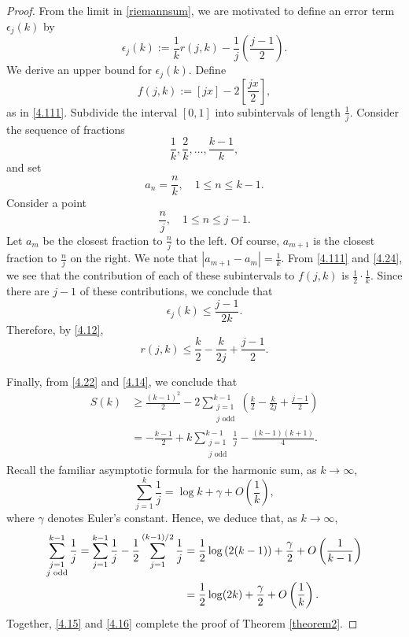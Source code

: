 \documentclass[11pt,reqno]{amsart}
\newcommand{\df}{\dfrac}
\theoremstyle{plain}
\numberwithin{equation}{section}
\begin{document}
\begin{proof}
From the limit in \eqref{riemannsum}, we are motivated to define an error term $\epsilon_j(k)$ by
\begin{equation}\label{4.12}
\epsilon_j(k):= \frac{1}{k} r(j,k) -\frac{1}{j}\left(\frac{j-1}{2}\right).
\end{equation}
 We derive an upper bound for $\epsilon_j(k).$  Define
 \begin{equation}\label{4.24}
  f(j,k):=[ jx]-2\left[\frac{jx}{2}\right],
  \end{equation}
  as in \eqref{4.111}.  Subdivide the interval $[0,1]$ into subintervals of length $\frac{1}{j}.$ Consider the sequence of fractions
 $$\frac{1}{k},\frac{2}{k},\dots,\frac{k-1}{k},$$
 and set
 $$a_n=\frac{n}{k},\quad 1\leq n \leq k-1.$$
 Consider a point
 $$\frac{n}{j}, \quad 1\leq n \leq j-1.$$
   Let $a_m$ be the closest fraction to $\frac{n}{j}$ to the left. Of course, $a_{m+1}$ is the closest fraction to $\frac{n}{j}$ on the right.  We note that $|a_{m+1}-a_m|=\frac{1}{k}$.  From \eqref{4.111} and \eqref{4.24}, we see that the contribution of each of these subintervals to $f(j,k)$ is $\frac12\cdot\frac{1}{k}$. Since there are $j-1$ of these contributions, we conclude that
 $$ \epsilon_j(k)\leq \dfrac{j-1}{2k}.$$
 Therefore, by \eqref{4.12},
 \begin{equation}\label{4.14}
 r(j,k)\leq \frac{k}{2}-\frac{k}{2j}+\frac{j-1}{2} .
\end{equation}

Finally, from \eqref{4.22} and \eqref{4.14}, we conclude that
\begin{align}\label{4.15}
	S(k)
	&\geq \frac{(k-1)^2}{2}-2\sum_{\substack{j=1\\j\text{ odd}}}^{k-1}\left(\frac{k}{2}-\frac{k}{2j}+\frac{j-1}{2}\right) \nonumber\\
 &=-\frac{k-1}{2}+k\sum_{\substack{j=1 \\j \text{ odd}}}^{k-1}\frac{1}{j}-\frac{(k-1)(k+1)}{4}.
\end{align}
Recall the familiar asymptotic formula for the harmonic sum, as $k\to\infty$,
$$ \sum_{j=1}^k\df{1}{j} = \log k +\gamma +O\left(\df{1}{k}\right), $$
where $\gamma$ denotes Euler's constant.  Hence, we deduce that, as $k\to\infty$,
\begin{align}\label{4.16}
\sum_{\substack{j=1\\j\text{ odd}}}^{k-1}\df{1}{j}= \sum_{j=1}^{k-1}\df{1}{j}- \df{1}{2}\sum_{j=1}^{(k-1)/2}\df{1}{j}=&\;\frac{1}{2}\log\left(2(k-1)\right)+\frac{\gamma}{2}+O\left(\frac{1}{k-1}\right)\notag\\
=&\;\frac{1}{2}\log(2k)+\frac{\gamma}{2}+O\left(\frac{1}{k}\right).
\end{align}
Together, \eqref{4.15} and \eqref{4.16} complete the proof of Theorem \ref{theorem2}.
\end{proof}
\end{document}
